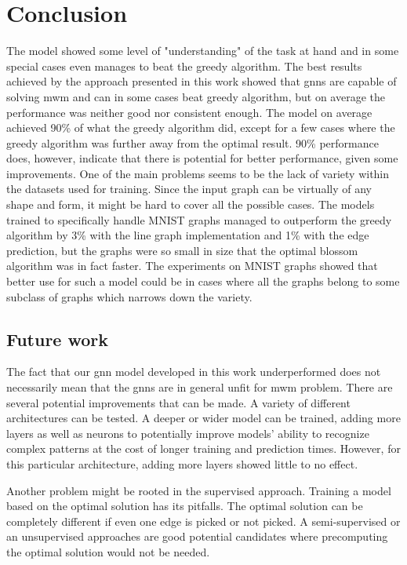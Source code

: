 \chapter{Conclusion}

The model showed some level of "understanding" of the task at hand and in some special cases even manages to beat the greedy algorithm. The best results achieved by the approach presented in this work showed that \gls{gnn}s are capable of solving \gls{mwm} and can in some cases beat greedy algorithm, but on average the performance was neither good nor consistent enough. The model on average achieved 90\% of what the greedy algorithm did, except for a few cases where the greedy algorithm was further away from the optimal result. 90\% performance does, however, indicate that there is potential for better performance, given some improvements. One of the main problems seems to be the lack of variety within the datasets used for training. Since the input graph can be virtually of any shape and form, it might be hard to cover all the possible cases. The models trained to specifically handle MNIST graphs managed to outperform the greedy algorithm by 3\% with the line graph implementation and 1\% with the edge prediction, but the graphs were so small in size that the optimal blossom algorithm was in fact faster. The experiments on MNIST graphs showed that better use for such a model could be in cases where all the graphs belong to some subclass of graphs which narrows down the variety. 

\section{Future work}

The fact that our \gls{gnn} model developed in this work underperformed does not necessarily mean that the \gls{gnn}s are in general unfit for \gls{mwm} problem. There are several potential improvements that can be made. A variety of different architectures can be tested. A deeper or wider model can be trained, adding more layers as well as neurons to potentially improve models' ability to recognize complex patterns at the cost of longer training and prediction times. However, for this particular architecture, adding more layers showed little to no effect. 

Another problem might be rooted in the supervised approach. Training a model based on the optimal solution has its pitfalls. The optimal solution can be completely different if even one edge is picked or not picked. A semi-supervised or an unsupervised approaches are good potential candidates where precomputing the optimal solution would not be needed.